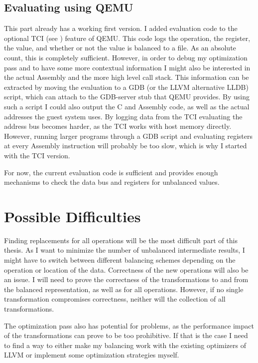 \documentclass{article}
\newcommand{\qemu}{QEMU}
\newcommand{\llvm}{LLVM}
\begin{document}
\subsection{Evaluating using \qemu{}}
This part already has a working first version.
I added evaluation code to the optional TCI (see ) feature of \qemu{}.
This code logs the operation, the register, the value, and whether or not the value is balanced to a file.
As an absolute count, this is completely sufficient.
However, in order to debug my optimization pass and to have some more contextual information I might also be interested in the actual Assembly and the more high level call stack.
This information can be extracted by moving the evaluation to a GDB (or the \llvm{} alternative LLDB) script, which can attach to the GDB-server stub that \qemu{} provides.
By using such a script I could also output the C and Assembly code, as well as the actual addresses the guest system uses.
By logging data from the TCI evaluating the address bus becomes harder, as the TCI works with host memory directly.
However, running larger programs through a GDB script and evaluating registers at every Assembly instruction will probably be too slow, which is why I started with the TCI version.

For now, the current evaluation code is sufficient and provides enough mechanisms to check the data bus and registers for unbalanced values.

\section{Possible Difficulties}
\label{sec:difficulties}
Finding replacements for all operations will be the most difficult part of this thesis.
As I want to minimize the number of unbalanced intermediate results, I might have to switch between different balancing schemes depending on the operation or location of the data.
Correctness of the new operations will also be an issue.
I will need to prove the correctness of the transformations to and from the balanced representation, as well as for all operations.
However, if no single transformation compromises correctness, neither will the collection of all transformations.

The optimization pass also has potential for problems, as the performance impact of the transformations can prove to be too prohibitive.
If that is the case I need to find a way to either make my balancing work with the existing optimizers of \llvm{} or implement some optimization strategies myself.
\end{document}
